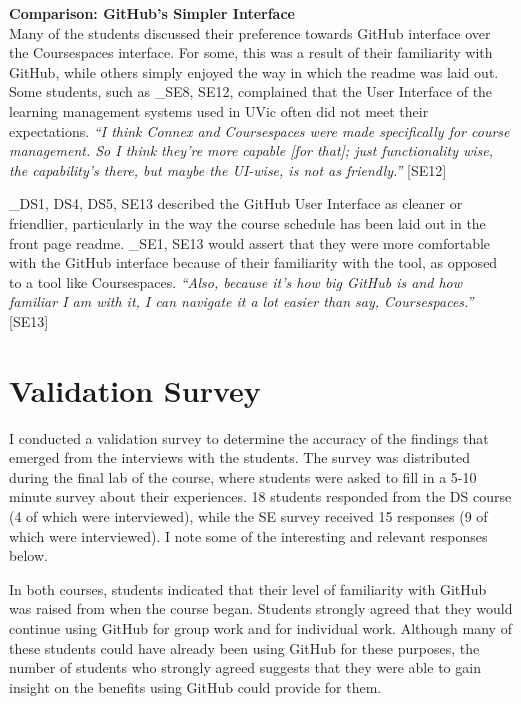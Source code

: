 \textbf{Comparison: GitHub's Simpler Interface} \\
Many of the students discussed their preference towards GitHub interface over the Coursespaces interface. For some, this was a result of their familiarity with GitHub, while others simply enjoyed the way in which the readme was laid out. Some students, such as _{SE8, SE12}, complained that the User Interface of the learning management systems used in UVic often did not meet their expectations. \textit{``I think Connex and Coursespaces were made specifically for course management. So I think they're more capable [for that]; just functionality wise, the capability's there, but maybe the UI-wise, is not as friendly.''} [SE12]

_{DS1, DS4, DS5, SE13} described the GitHub User Interface as cleaner or friendlier, particularly in the way the course schedule has been laid out in the front page readme. _{SE1, SE13} would assert that they were more comfortable with the GitHub interface because of their familiarity with the tool, as opposed to a tool like Coursespaces. \textit{``Also, because it's how big GitHub is and how familiar I am with it, I can navigate it a lot easier than say, Coursespaces.''} [SE13]


\section{Validation Survey}
I conducted a validation survey to determine the accuracy of the findings that emerged from the interviews with the students. The survey was distributed during the final lab of the course, where students were asked to fill in a 5-10 minute survey about their experiences. 18 students responded from the DS course (4 of which were interviewed), while the SE survey received 15 responses (9 of which were interviewed). I note some of the interesting and relevant responses below.

In both courses, students indicated that their level of familiarity with GitHub was raised from when the course began. Students strongly agreed that they would continue using GitHub for group work and for individual work. Although many of these students could have already been using GitHub for these purposes, the number of students who strongly agreed suggests that they were able to gain insight on the benefits using GitHub could provide for them.

